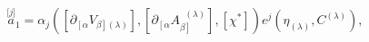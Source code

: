 \begin{equation}
\stackrel{\lbrack j]}{a}_{1}=\alpha _{j}\left( \left[ \partial _{\left[
\alpha \right. }V_{\left. \beta \right] (\lambda )}\right] ,\left[ \partial
_{\left[ \alpha \right. }A_{\left. \beta \right] }^{\;\;(\lambda )}\right]
,\left[ \chi ^{*}\right] \right) e^{j}\left( \eta _{(\lambda )},C^{(\lambda
)}\right) ,  \label{bf59}
\end{equation}

